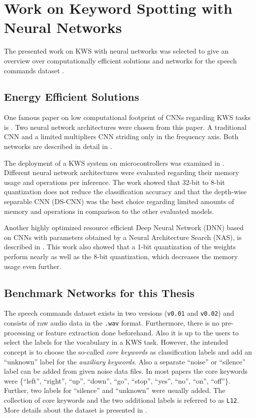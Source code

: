 
\section{Work on Keyword Spotting with Neural Networks}\label{sec:prev_kws}
The presented work on KWS with neural networks was selected to give an overview over computationally efficient solutions and networks for the speech commands dataset \cite{Warden2018}.



\subsection{Energy Efficient Solutions}
One famous paper on low computational footprint of CNNs regarding KWS tasks is \cite{Sainath2015}.
Two neural network architectures were chosen from this paper.
A traditional CNN and a limited multipliers CNN striding only in the frequency axis.
Both networks are described in detail in .

The deployment of a KWS system on microcontrollers was examined in \cite{Zhang2017}.
Different neural network architectures were evaluated regarding their memory usage and operations per inference.
The work showed that 32-bit to 8-bit quantization does not reduce the classification accuracy and that the depth-wise separable CNN (DS-CNN) was the best choice regarding limited amounts of memory and operations in comparison to the other evaluated models.

Another highly optimized resource efficient Deep Neural Network (DNN) based on CNNs with parameters obtained by a Neural Architecture Search (NAS), is described in \cite{Peter2020}.
This work also showed that a 1-bit quantization of the weights perform nearly as well as the 8-bit quantization, which decreases the memory usage even further.



\subsection{Benchmark Networks for this Thesis}\label{sec:prev_kws_benchmark}
The speech commands dataset \cite{Warden2018} exists in two versions (\texttt{v0.01} and \texttt{v0.02}) and consists of raw audio data in the \texttt{.wav} format.
Furthermore, there is no pre-processing or feature extraction done beforehand.
Also it is up to the users to select the labels for the vocabulary in a KWS task.
However, the intended concept is to choose the so-called \emph{core keywords} as classification labels and add an \enquote{unknown} label for the \emph{auxiliary keywords}.
Also a separate \enquote{noise} or \enquote{silence} label can be added from given noise data files.
In most papers the core keywords were \{\enquote{left},  \enquote{right}, \enquote{up}, \enquote{down}, \enquote{go}, \enquote{stop}, \enquote{yes}, \enquote{no}, \enquote{on}, \enquote{off}\}.
Further, two labels for \enquote{silence} and \enquote{unknown} were usually added.
The collection of core keywords and the two additional labels is referred to as \texttt{L12}.
More details about the dataset is presented in .

